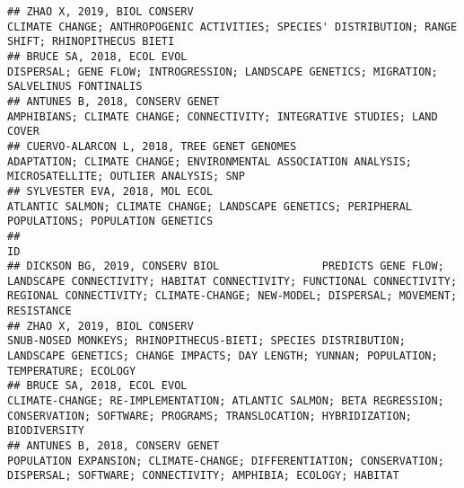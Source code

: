 \documentclass[]{article}
\begin{document}
\begin{verbatim}
## ZHAO X, 2019, BIOL CONSERV                                                                                                                                                                                                                 CLIMATE CHANGE; ANTHROPOGENIC ACTIVITIES; SPECIES' DISTRIBUTION; RANGE SHIFT; RHINOPITHECUS BIETI
## BRUCE SA, 2018, ECOL EVOL                                                                                                                                                                                                                          DISPERSAL; GENE FLOW; INTROGRESSION; LANDSCAPE GENETICS; MIGRATION; SALVELINUS FONTINALIS
## ANTUNES B, 2018, CONSERV GENET                                                                                                                                                                                                                                     AMPHIBIANS; CLIMATE CHANGE; CONNECTIVITY; INTEGRATIVE STUDIES; LAND COVER
## CUERVO-ALARCON L, 2018, TREE GENET GENOMES                                                                                                                                                                                             ADAPTATION; CLIMATE CHANGE; ENVIRONMENTAL ASSOCIATION ANALYSIS; MICROSATELLITE; OUTLIER ANALYSIS; SNP
## SYLVESTER EVA, 2018, MOL ECOL                                                                                                                                                                                                               ATLANTIC SALMON; CLIMATE CHANGE; LANDSCAPE GENETICS; PERIPHERAL POPULATIONS; POPULATION GENETICS
##                                                                                                                                                                                                                         ID
## DICKSON BG, 2019, CONSERV BIOL                PREDICTS GENE FLOW; LANDSCAPE CONNECTIVITY; HABITAT CONNECTIVITY; FUNCTIONAL CONNECTIVITY; REGIONAL CONNECTIVITY; CLIMATE-CHANGE; NEW-MODEL; DISPERSAL; MOVEMENT; RESISTANCE
## ZHAO X, 2019, BIOL CONSERV                                         SNUB-NOSED MONKEYS; RHINOPITHECUS-BIETI; SPECIES DISTRIBUTION; LANDSCAPE GENETICS; CHANGE IMPACTS; DAY LENGTH; YUNNAN; POPULATION; TEMPERATURE; ECOLOGY
## BRUCE SA, 2018, ECOL EVOL                                                CLIMATE-CHANGE; RE-IMPLEMENTATION; ATLANTIC SALMON; BETA REGRESSION; CONSERVATION; SOFTWARE; PROGRAMS; TRANSLOCATION; HYBRIDIZATION; BIODIVERSITY
## ANTUNES B, 2018, CONSERV GENET                                                          POPULATION EXPANSION; CLIMATE-CHANGE; DIFFERENTIATION; CONSERVATION; DISPERSAL; SOFTWARE; CONNECTIVITY; AMPHIBIA; ECOLOGY; HABITAT

\end{verbatim}
\end{document}
